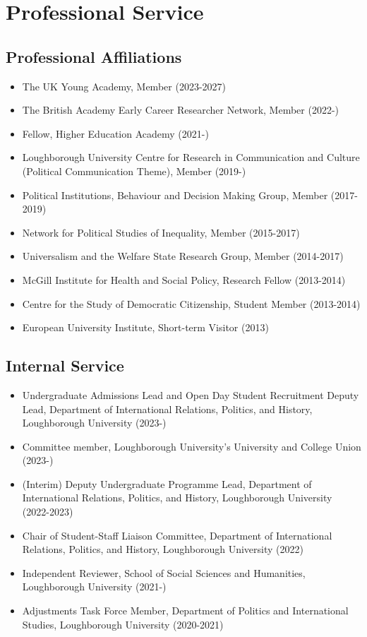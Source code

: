 \documentclass[letterpaper,fontsize=10.5pt]{scrartcl}
\begin{document}
\section{Professional Service}
\subsection{Professional Affiliations}
\begin{itemize}[itemsep=0em, topsep=0em, partopsep=0em]
	\item The UK Young Academy, Member (2023-2027)
	\item The British Academy Early Career Researcher Network, Member (2022-)
	\item Fellow, Higher Education Academy (2021-)
	\item Loughborough University Centre for Research in Communication and Culture (Political Communication Theme), Member (2019-)
	\item Political Institutions, Behaviour and Decision Making Group, Member (2017-2019)
	\item Network for Political Studies of Inequality, Member (2015-2017)
	\item Universalism and the Welfare State Research Group, Member (2014-2017)
	\item McGill Institute for Health and Social Policy, Research Fellow (2013-2014)
	\item Centre for the Study of Democratic Citizenship, Student Member (2013-2014)
	\item European University Institute, Short-term Visitor (2013)
\end{itemize} 
\subsection{Internal Service}
\begin{itemize}[itemsep=0em, topsep=0em, partopsep=0em]
	\item Undergraduate Admissions Lead and Open Day Student Recruitment Deputy Lead, Department of International Relations, Politics, and History, Loughborough University (2023-)
	\item Committee member, Loughborough University's University and College Union (2023-)
	\item (Interim) Deputy Undergraduate Programme Lead, Department of International Relations, Politics, and History, Loughborough University (2022-2023)
	\item Chair of Student-Staff Liaison Committee, Department of International Relations, Politics, and History, Loughborough University (2022)
	\item Independent Reviewer, School of Social Sciences and Humanities, Loughborough University (2021-)
	\item Adjustments Task Force Member, Department of Politics and International Studies, Loughborough University (2020-2021)\\
\end{itemize}
\end{document}
